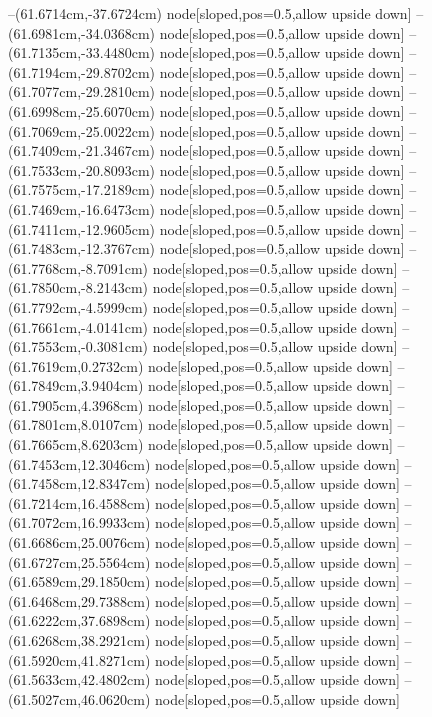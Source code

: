 --(61.6714cm,-37.6724cm) node[sloped,pos=0.5,allow upside down]{\arrowIn}
--(61.6981cm,-34.0368cm) node[sloped,pos=0.5,allow upside down]{\ArrowIn}
--(61.7135cm,-33.4480cm) node[sloped,pos=0.5,allow upside down]{\arrowIn}
--(61.7194cm,-29.8702cm) node[sloped,pos=0.5,allow upside down]{\ArrowIn}
--(61.7077cm,-29.2810cm) node[sloped,pos=0.5,allow upside down]{\arrowIn}
--(61.6998cm,-25.6070cm) node[sloped,pos=0.5,allow upside down]{\ArrowIn}
--(61.7069cm,-25.0022cm) node[sloped,pos=0.5,allow upside down]{\arrowIn}
--(61.7409cm,-21.3467cm) node[sloped,pos=0.5,allow upside down]{\ArrowIn}
--(61.7533cm,-20.8093cm) node[sloped,pos=0.5,allow upside down]{\arrowIn}
--(61.7575cm,-17.2189cm) node[sloped,pos=0.5,allow upside down]{\ArrowIn}
--(61.7469cm,-16.6473cm) node[sloped,pos=0.5,allow upside down]{\arrowIn}
--(61.7411cm,-12.9605cm) node[sloped,pos=0.5,allow upside down]{\ArrowIn}
--(61.7483cm,-12.3767cm) node[sloped,pos=0.5,allow upside down]{\arrowIn}
--(61.7768cm,-8.7091cm) node[sloped,pos=0.5,allow upside down]{\ArrowIn}
--(61.7850cm,-8.2143cm) node[sloped,pos=0.5,allow upside down]{\arrowIn}
--(61.7792cm,-4.5999cm) node[sloped,pos=0.5,allow upside down]{\ArrowIn}
--(61.7661cm,-4.0141cm) node[sloped,pos=0.5,allow upside down]{\arrowIn}
--(61.7553cm,-0.3081cm) node[sloped,pos=0.5,allow upside down]{\ArrowIn}
--(61.7619cm,0.2732cm) node[sloped,pos=0.5,allow upside down]{\arrowIn}
--(61.7849cm,3.9404cm) node[sloped,pos=0.5,allow upside down]{\ArrowIn}
--(61.7905cm,4.3968cm) node[sloped,pos=0.5,allow upside down]{\arrowIn}
--(61.7801cm,8.0107cm) node[sloped,pos=0.5,allow upside down]{\ArrowIn}
--(61.7665cm,8.6203cm) node[sloped,pos=0.5,allow upside down]{\arrowIn}
--(61.7453cm,12.3046cm) node[sloped,pos=0.5,allow upside down]{\ArrowIn}
--(61.7458cm,12.8347cm) node[sloped,pos=0.5,allow upside down]{\arrowIn}
--(61.7214cm,16.4588cm) node[sloped,pos=0.5,allow upside down]{\ArrowIn}
--(61.7072cm,16.9933cm) node[sloped,pos=0.5,allow upside down]{\arrowIn}
--(61.6686cm,25.0076cm) node[sloped,pos=0.5,allow upside down]{\ArrowIn}
--(61.6727cm,25.5564cm) node[sloped,pos=0.5,allow upside down]{\arrowIn}
--(61.6589cm,29.1850cm) node[sloped,pos=0.5,allow upside down]{\ArrowIn}
--(61.6468cm,29.7388cm) node[sloped,pos=0.5,allow upside down]{\arrowIn}
--(61.6222cm,37.6898cm) node[sloped,pos=0.5,allow upside down]{\ArrowIn}
--(61.6268cm,38.2921cm) node[sloped,pos=0.5,allow upside down]{\arrowIn}
--(61.5920cm,41.8271cm) node[sloped,pos=0.5,allow upside down]{\ArrowIn}
--(61.5633cm,42.4802cm) node[sloped,pos=0.5,allow upside down]{\arrowIn}
--(61.5027cm,46.0620cm) node[sloped,pos=0.5,allow upside down]{\ArrowIn}
